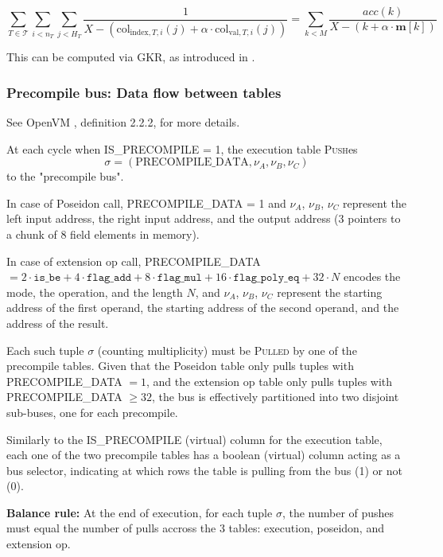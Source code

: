 \documentclass{article}
\theoremstyle{definition}
\begin{document}
$$\sum_{T \in \mathcal{T}} \sum_{i<n_T} \sum_{j<H_T} \frac{1}{X - (\text{col}_{\text{index},T,i}(j) + \alpha \cdot \text{col}_{\text{val},T,i}(j))} = \sum_{k<M} \frac{\textit{acc}(k)}{X - (k + \alpha \cdot \textbf{m}[k])}$$

This can be computed via GKR, as introduced in \cite{logup_gkr}.

\subsubsection{Precompile bus: Data flow between tables}\label{buses}

See OpenVM \cite{openvm}, definition 2.2.2, for more details.

At each cycle when IS\_PRECOMPILE = 1, the execution table \textsc{Push}es $$\sigma = (\text{PRECOMPILE\_DATA}, \nu_A, \nu_B, \nu_C)$$ to the "precompile bus".

In case of Poseidon call, PRECOMPILE\_DATA = 1 and $\nu_A$, $\nu_B$, $\nu_C$ represent the left input address, the right input address, and the output address (3 pointers to a chunk of 8 field elements in memory).

In case of extension op call, PRECOMPILE\_DATA $= 2 \cdot \texttt{is\_be} + 4 \cdot \texttt{flag\_add} + 8 \cdot \texttt{flag\_mul} + 16 \cdot \texttt{flag\_poly\_eq} + 32 \cdot N$ encodes the mode, the operation, and the length $N$, and $\nu_A$, $\nu_B$, $\nu_C$ represent the starting address of the first operand, the starting address of the second operand, and the address of the result.

Each such tuple $\sigma$ (counting multiplicity) must be \textsc{Pulled} by one of the precompile tables. Given that the Poseidon table only pulls tuples with PRECOMPILE\_DATA $= 1$, and the extension op table only pulls tuples with PRECOMPILE\_DATA $\geq 32$, the bus is effectively partitioned into two disjoint sub-buses, one for each precompile.

Similarly to the IS\_PRECOMPILE (virtual) column for the execution table, each one of the two precompile tables has a boolean (virtual) column acting as a bus selector, indicating at which rows the table is pulling from the bus (1) or not (0).

\vspace{3mm}

\textbf{Balance rule:} At the end of execution, for each tuple $\sigma$, the number of pushes must equal the number of pulls accross the 3 tables: execution, poseidon, and extension op.
\end{document}
